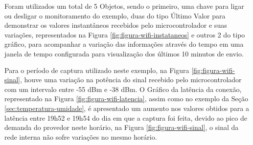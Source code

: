         \begin{figure}[!h]
    	\end{figure}


Foram utilizados um total de 5 Objetos, sendo o primeiro, uma chave para ligar ou desligar o monitoramento do exemplo, duas do tipo Último Valor para demonstrar os valores instantâneos recebidos pelo microcontrolador e suas variações, representados na Figura \ref{fig:figura-wifi-instataneos} e outros 2 do tipo gráfico, para acompanhar a variação das informações através do tempo em uma janela de tempo configurada para visualização dos últimos 10 minutos de envio. 

        \begin{figure}[!h]
    	\end{figure}
\newpage

Para o período de captura utilizado neste exemplo, na Figura \ref{fig:figura-wifi-sinal}, houve uma variação na potência do sinal recebido pelo microcontrolador com um intervalo entre -55 dBm e -38 dBm. O Gráfico da latência da conexão, representado na Figura \ref{fig:figura-wifi-latencia}, assim como no exemplo da Seção \ref{sec:temperatura-umidade}, é apresentado um aumento nos valores obtidos para a latência entre 19h52 e 19h54 do dia em que a captura foi feita, devido ao pico de demanda do provedor neste horário, na Figura \ref{fig:figura-wifi-sinal}, o sinal da rede interna não sofre variações no mesmo horário.
    	
